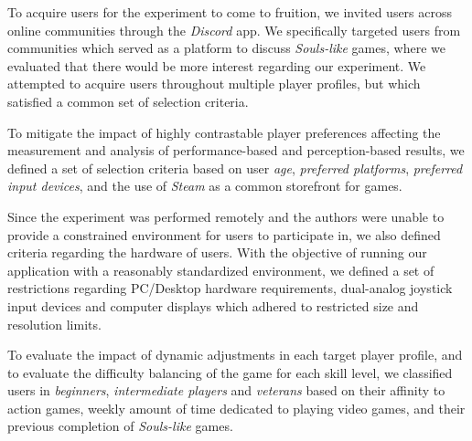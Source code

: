 To acquire users for the experiment to come to fruition, we invited users across online communities through the \emph{Discord} app. We specifically targeted users from communities which served as a platform to discuss \emph{Souls-like} games, where we evaluated that there would be more interest regarding our experiment. We attempted to acquire users throughout multiple player profiles, but which satisfied a common set of selection criteria.

To mitigate the impact of highly contrastable player preferences affecting the measurement and analysis of performance-based and perception-based results, we defined a set of selection criteria based on user \emph{age}, \emph{preferred platforms}, \emph{preferred input devices}, and the use of \emph{Steam} as a common storefront for games.

Since the experiment was performed remotely and the authors were unable to provide a constrained environment for users to participate in, we also defined criteria regarding the hardware of users. With the objective of running our application with a reasonably standardized environment, we defined a set of restrictions regarding PC/Desktop hardware requirements, dual-analog joystick input devices and computer displays which adhered to restricted size and resolution limits.

To evaluate the impact of dynamic adjustments in each target player profile, and to evaluate the difficulty balancing of the game for each skill level, we classified users in \emph{beginners}, \emph{intermediate players} and \emph{veterans} based on their affinity to action games, weekly amount of time dedicated to playing video games, and their previous completion of \emph{Souls-like} games.

